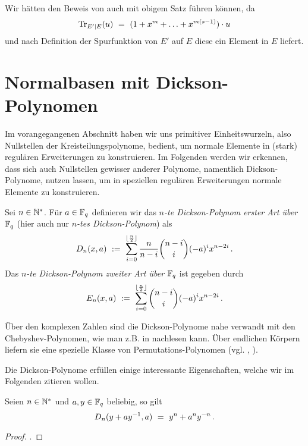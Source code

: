 \begin{bemerkung}
  Wir hätten den Beweis von  auch mit obigem
  Satz führen können, da 
  \[ \operatorname{Tr}_{E'\mid E}(u) \ =\  (1+x^m+\ldots + x^{m(s-1)})\cdot u \]
  und nach Definition der Spurfunktion von 
  $E'$ auf $E$ diese ein Element in $E$ liefert. 
\end{bemerkung}



\section{Normalbasen mit Dickson-Polynomen}

Im vorangegangenen Abschnitt haben wir uns primitiver Einheitswurzeln,
also Nullstellen der Kreisteilungspolynome, bedient,
um normale Elemente in (stark) regulären Erweiterungen zu konstruieren. Im
Folgenden werden wir erkennen, dass sich auch Nullstellen gewisser anderer
Polynome, namentlich Dickson-Polynome, nutzen lassen, um in speziellen
regulären Erweiterungen normale Elemente zu konstruieren.

\begin{definition}
  Sei $n \in \mathbb{N}^\ast$. Für $a \in \mathbb{F}_q$ definieren wir das
  \emph{$n$-te Dickson-Polynom erster Art über $\mathbb{F}_q$} 
  (hier auch nur \emph{$n$-tes Dickson-Polynom}) als
  \[ D_n(x,a) \ :=\  \sum_{i=0}^{\lfloor\frac n 2\rfloor} \frac{n}{n-i}
    \binom{n-i}{i} (-a)^i x^{n-2i}\,.\]
  Das \emph{$n$-te Dickson-Polynom zweiter Art über $\mathbb{F}_q$} ist gegeben durch
  \[ E_n(x,a) \ :=\  \sum_{i=0}^{\lfloor\frac n 2\rfloor} 
    \binom{n-i}{i} (-a)^i x^{n-2i}\,.\]
\end{definition}

\begin{bemerkung}
  Über den komplexen Zahlen sind die Dickson-Polynome 
  nahe verwandt mit den
  Chebyshev-Polynomen, wie man z.B. in \autocite[Absatz nach Corollary
  7.15]{lidl1997finite} nachlesen kann.
  Über endlichen Körpern liefern sie eine spezielle Klasse von
  Permutations-Polynomen (vgl. \autocite[Theorem 7.16]{lidl1997finite}, 
  \autocite[Section 9.6]{mullen2013handbook}).
\end{bemerkung}

Die Dickson-Polynome erfüllen einige interessante Eigenschaften, 
welche wir im Folgenden zitieren wollen.

\begin{proposition}
  \label{satz:dickson_1}
   Seien $n\in \mathbb{N}^\ast$ und $a,y\in \mathbb{F}_q$ beliebig, so gilt
  \[ D_n(y+ay^{-1}, a) \ =\  y^n +a^ny^{-n}\,.\]
\end{proposition}
\begin{proof}
  \autocite[Gleichung (7.8)]{lidl1997finite}.
\end{proof}

